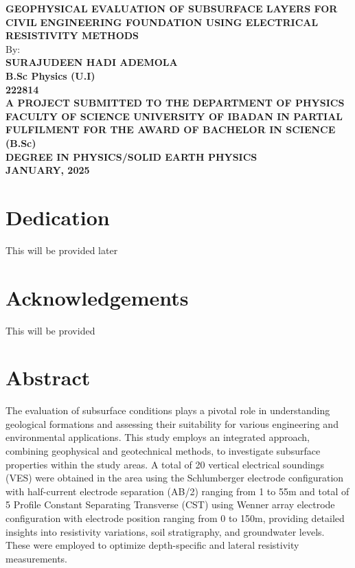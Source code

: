 \documentclass[12pt,a4paper]{report}
\begin{document}
\begin{titlepage}
    \begin{center}
        \large\textbf{GEOPHYSICAL EVALUATION OF SUBSURFACE LAYERS FOR CIVIL}
        \large\textbf{ENGINEERING FOUNDATION USING ELECTRICAL RESISTIVITY METHODS} \\[3.3cm]
        
        By: \\[0.2cm]
        
        \Large\textbf{SURAJUDEEN HADI ADEMOLA} \\[0.1cm]
        \Large\textbf{B.Sc Physics (U.I)} \\[0.1cm]
        \Large\textbf{222814} \\[3.3cm]
        
        \large\textbf{A PROJECT SUBMITTED TO THE DEPARTMENT OF PHYSICS FACULTY OF SCIENCE
        UNIVERSITY OF IBADAN IN PARTIAL FULFILMENT FOR THE AWARD OF BACHELOR IN SCIENCE (B.Sc) \\
        DEGREE IN PHYSICS/SOLID EARTH PHYSICS} \\[4cm]
        
        \textbf{JANUARY, 2025}
    \end{center}
\end{titlepage}


\chapter*{Dedication}
\justifying
This will be provided later

\chapter*{Acknowledgements}
\justifying
This will be provided

\chapter*{Abstract}
\justifying
The evaluation of subsurface conditions plays a pivotal role in understanding geological formations and assessing their suitability for various engineering and environmental applications. This study employs an integrated approach, combining geophysical and geotechnical methods, to investigate subsurface properties within the study areas. A total of 20 vertical electrical soundings (VES) were obtained in the area using the Schlumberger electrode configuration with half-current electrode separation (AB/2) ranging from 1 to 55m and total of 5 Profile Constant Separating Transverse (CST) using Wenner array electrode configuration with electrode position ranging from 0 to 150m, providing detailed insights into resistivity variations, soil stratigraphy, and groundwater levels. These were employed to optimize depth-specific and lateral resistivity measurements.
\end{document}
